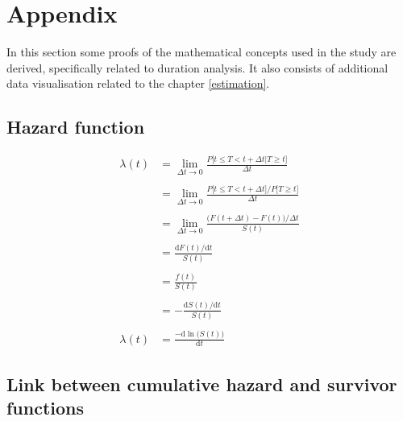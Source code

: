 \documentclass[
]{book}
\begin{document}
\hypertarget{appendix}{%
\chapter*{Appendix}\label{appendix}}

In this section some proofs of the mathematical concepts used in the study are derived, specifically related to duration analysis. It also consists of additional data visualisation related to the chapter \ref{estimation}.

\hypertarget{hazard-function}{%
\section*{Hazard function}\label{hazard-function}}

\begin{equation}    
  \begin{aligned}
  \lambda(t) & = \lim_{\Delta t \to 0} \frac{P\big[t \leq T < t + \Delta t | T \geq t \big]}{\Delta t} \\\\
  & = \lim_{\Delta t \to 0} \frac{P\big[t \leq T < t + \Delta t \big] / P\big[T \geq t  \big]}{\Delta t} \\\\
  & = \lim_{\Delta t \to 0} \frac{\big(F(t+\Delta t)-F(t)\big) / \Delta t}{S(t)} \\\\
  & = \frac{\text{d} F(t) / \text{d} t}{S(t)} \\\\
  & = \frac{f(t)}{S(t)} \\\\
  & = - \frac{\text{d}S(t) / \text{d} t}{S(t)} \\\\
  \lambda(t) & = \frac{-\text{d} \ln \big(S(t)\big)}{\text{d} t}
  \end{aligned}
  \label{eq:hazfunproof}
\end{equation}

\hypertarget{link-between-cumulative-hazard-and-survivor-functions}{%
\section*{Link between cumulative hazard and survivor functions}\label{link-between-cumulative-hazard-and-survivor-functions}}
\end{document}
